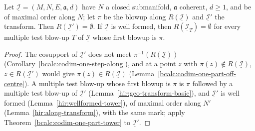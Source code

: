 \begin{corollary}
\label{bcalc:codim-one-part-empty}
\upstreamleanok
Let \(\underline{\mathcal I}=(M,N,E,\mathfrak a,d)\) have \(N\) a closed submanifold, \(\mathfrak a\) coherent, \(d\ge1\), and be of maximal order along \(N\); let \(\pi\) be
the blowup along \(R(\underline{\mathcal I})\) and \(\underline{\mathcal I}'\) the transform. Then \(R(\underline{\mathcal I}')=\emptyset\). If \(\underline{\mathcal I}\) is well
formed, then \(R(\underline{\mathcal I}_T)=\emptyset\) for every multiple test blow-up \(T\) of \(\underline{\mathcal I}\) whose first blowup is \(\pi\).
\end{corollary}
\begin{proof}
\upstreamleanok
The cosupport of \(\underline{\mathcal I}'\) does not meet \(\pi^{-1}(R(\underline{\mathcal I}))\) (Corollary~\ref{bcalc:codim-one-step-along}), and at a point \(z\) with
\(\pi(z)\notin R(\underline{\mathcal I})\), \(z\in R(\underline{\mathcal I}')\) would give \(\pi(z)\in R(\underline{\mathcal I})\) (Lemma~\ref{bcalc:codim-one-part-off-centre}). A multiple
test blow-up whose first blowup is \(\pi\) is \(\pi\) followed by a multiple test blow-up of \(\underline{\mathcal I}'\) (Lemma~\ref{hir:geo-transform-basic}), and
\(\underline{\mathcal I}'\) is well formed (Lemma~\ref{hir:wellformed-tower}), of maximal order along \(N'\) (Lemma~\ref{hir:along-transform}), with the same mark; apply
Theorem~\ref{bcalc:codim-one-part-tower} to \(\underline{\mathcal I}'\).
\end{proof}


